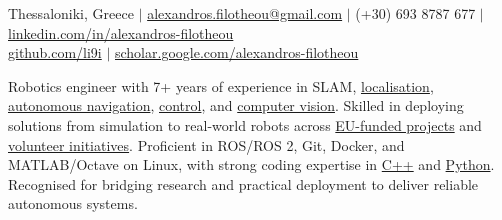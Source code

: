 \documentclass[a4paper,10pt,twoside]{article}
\begin{document}

\par{\bigskip\par}

\begin{center}
{\footnotesize Thessaloniki, Greece $|$ \href{mailto:alexandros.filotheou@gmail.com}{alexandros.filotheou@gmail.com} $|$ (+30) 693 8787 677 $|$ \href{https://www.linkedin.com/in/alexandros-filotheou-5b6a8676/}{linkedin.com/in/alexandros-filotheou} \\ \href{https://github.com/li9i/}{github.com/li9i} $|$  \href{https://scholar.google.com/citations?hl=en&user=9_hI4hMAAAAJ&view_op=list_works}{scholar.google.com/alexandros-filotheou}}\vspace{1em}
\end{center}

\vspace{-0.5cm}
\begin{bw_box} \small
  Robotics engineer with 7+ years of experience in SLAM, \href{https://github.com/li9i/fsm-lo}{localisation}, \href{https://link.springer.com/article/10.1007/s10846-019-01086-y}{autonomous navigation}, \href{https://www.tandfonline.com/doi/full/10.1080/00207179.2018.1514129}{control}, and \href{https://github.com/li9i/pandora\_vision\_2014}{computer vision}. Skilled in deploying solutions from simulation to real-world robots across \href{https://www.robetarme-project.eu/}{EU-funded projects} and \href{https://issel.ee.auth.gr/pandora-robotics/}{volunteer initiatives}. Proficient in ROS/ROS 2, Git, Docker, and MATLAB/Octave on Linux, with strong coding expertise in \href{https://github.com/li9i/fsm}{C++} and \href{https://github.com/cultureid-auth-ros-packages/cultureid-waypoints-following}{Python}. Recognised for bridging research and practical deployment to deliver reliable autonomous systems.
\end{bw_box}
\end{document}
